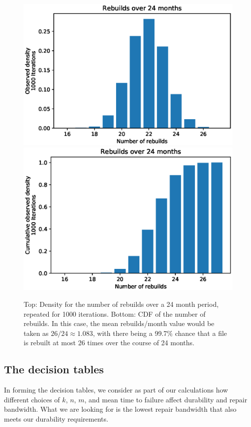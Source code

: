 \linespread{1}
\begin{figure}[h]
    \centering
    \includegraphics[scale=0.5]{RS-appendix-files/example_pmf.eps}
    \includegraphics[scale=0.5]{RS-appendix-files/example_cdf.eps}
    \caption{Top: Density for the number of rebuilds over a 24 month period, repeated for 1000 iterations. Bottom: CDF of the number of rebuilds. In this case, the mean rebuilds/month value would be taken as $26/24\approx1.083$, with there being a 99.7\% chance that a file is rebuilt at most 26 times over the course of 24 months.}
    \label{fig:sim_method}
\end{figure}

\pagebreak
\linespread{1}
\pagebreak
\subsection{The decision tables}
In forming the decision tables, we consider as part of our calculations how
different choices of $k$, $n$, $m$, and mean time to failure affect durability and repair bandwidth. What we are looking for is the lowest repair bandwidth that also meets our
durability requirements.




